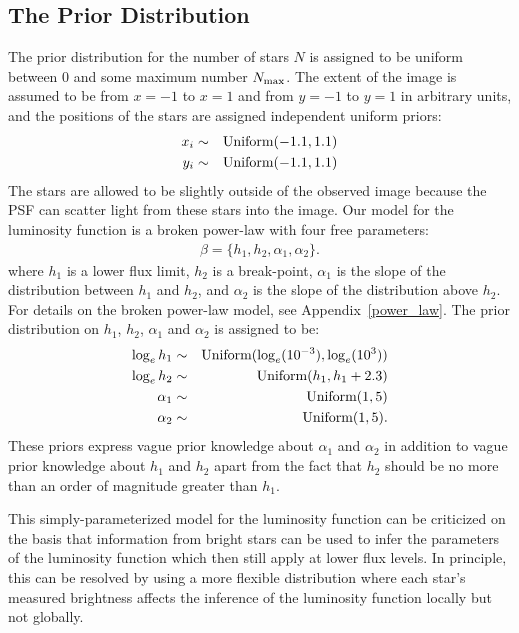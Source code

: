 \documentclass[manuscript]{aastex}
\begin{document}
\subsection{The Prior Distribution}
The prior distribution for the number of stars $N$ is assigned to be uniform between 0 and some maximum number $N_{\rm max}$. The extent of the image is assumed to be
from $x=-1$ to $x=1$ and from $y=-1$ to $y=1$ in arbitrary units, and the
positions of the stars are assigned independent uniform priors:
\begin{eqnarray}
x_i &\sim& \textnormal{Uniform}(-1.1, 1.1) \\
y_i &\sim& \textnormal{Uniform}(-1.1, 1.1)
\end{eqnarray}
The stars are allowed to be slightly outside of the observed image because the
PSF can scatter light from these stars into the image. Our model for the
luminosity function is a broken power-law with four
free parameters:
\begin{eqnarray}
\beta = \{h_1, h_2, \alpha_1, \alpha_2\}.
\end{eqnarray}
where $h_1$ is a lower flux limit, $h_2$ is a break-point, $\alpha_1$ is
the slope of the distribution between $h_1$ and $h_2$, and $\alpha_2$ is the
slope of the distribution above $h_2$. For details on the broken power-law
model, see Appendix~\ref{power_law}. The prior distribution on $h_1$, $h_2$,
$\alpha_1$ and $\alpha_2$ is assigned to be:
\begin{eqnarray}
\log_e h_1 &\sim& \textnormal{Uniform}(\log_e(10^{-3}), \log_e(10^3)) \\
\log_e h_2 &\sim& \textnormal{Uniform}(h_1, h_1 + 2.3) \\
\alpha_1 &\sim& \textnormal{Uniform}(1, 5) \\
\alpha_2 &\sim& \textnormal{Uniform}(1, 5).
\end{eqnarray}
These priors express vague prior knowledge about $\alpha_1$ and $\alpha_2$ in
addition to vague prior knowledge about $h_1$ and $h_2$ apart from the fact
that $h_2$ should be no more than an order of magnitude greater than $h_1$.

This simply-parameterized model for the luminosity function can be criticized
on the basis that information from bright stars can be used to infer the
parameters of the luminosity function which then still apply at lower flux
levels. In principle, this can be resolved by using a more flexible distribution
\citep[e.g.][]{2008ApJ...682..874K} where each star's measured brightness
affects the inference of the luminosity function locally but not globally.
 
\end{document}

